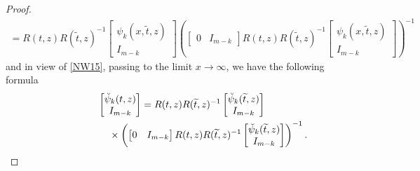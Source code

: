 \documentclass[pdftex]{sigma}
\def\wt{\widetilde}
\numberwithin{equation}{section}
\begin{document}
\begin{proof}
\begin{gather*}
=
R(t,z)R(\wt t,z)^{-1}\begin{bmatrix}\psi_k(x, \wt t,z) \\ I_{m-k} \end{bmatrix} \left(
  \begin{bmatrix}0 &I_{m-k} \end{bmatrix}
 R(t,z)R(\wt t,z)^{-1}\begin{bmatrix}\psi_k(x, \wt t,z) \\ I_{m-k} \end{bmatrix} \right)^{-1}
\end{gather*}
and in view of \eqref{NW15}, passing to the limit $x \to \infty$, we have the following formula{\samepage
\begin{gather}\nonumber
\begin{bmatrix}\breve \psi_k( t,z) \\ I_{m-k} \end{bmatrix}
=
R(t,z)R(\wt t,z)^{-1}\begin{bmatrix}\breve \psi_k( \wt t,z) \\ I_{m-k} \end{bmatrix}
\\ \label{NW33}
\hphantom{\begin{bmatrix}\breve \psi_k( t,z) \\ I_{m-k} \end{bmatrix}
= }{}\times
 \left(
  \begin{bmatrix}0 &I_{m-k} \end{bmatrix}
 R(t,z)R(\wt t,z)^{-1}\begin{bmatrix}\breve \psi_k(\wt t,z) \\ I_{m-k} \end{bmatrix} \right)^{-1}.
\end{gather}}


\end{proof}
\end{document}
